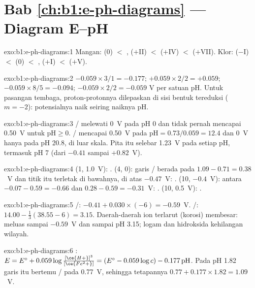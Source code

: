 \section*{Bab \ref{ch:b1:e-ph-diagrams} --- Diagram E--pH}

\begin{solution}{exo:b1:e-ph-diagrams:1}
Mangan:  (0) $<$ ,  ($+$II) $<$ 
($+$IV) $<$  ($+$VII). Klor:  ($-$I) $<$  (0)
$<$ ,  ($+$I) $<$  ($+$V).
\end{solution}

\begin{solution}{exo:b1:e-ph-diagrams:2}
$-0.059 \times 3/1 = -0.177$; $+0.059 \times 2/2 = +0.059$;
$-0.059 \times 8/5 = -0.094$; $-0.059 \times 2/2 = -0.059$ V per satuan
pH. Untuk pasangan tembaga, proton-protonnya dilepaskan di sisi bentuk
tereduksi ($m = -2$): potensialnya naik seiring naiknya pH.
\end{solution}

\begin{solution}{exo:b1:e-ph-diagrams:3}
/ melewati 0~V pada pH 0 dan tidak pernah mencapai 0.50~V
untuk $\mathrm{pH} \geqslant 0$. / mencapai 0.50~V pada
$\mathrm{pH} = 0.73/0.059 = 12.4$ dan 0~V hanya pada pH 20.8, di luar
skala. Pita itu selebar \qty{1.23}{V} pada setiap pH, termasuk pH 7
(dari $-0.41$ sampai $+0.82$~V).
\end{solution}

\begin{solution}{exo:b1:e-ph-diagrams:4}
(1, 1.0~V): . (4, 0): garis / berada pada
$1.09 - 0.71 = 0.38$~V dan titik itu terletak di bawahnya, di atas
$-0.47$~V: . (10, $-0.4$~V): antara $-0.07 - 0.59 = -0.66$ dan
$0.28 -
0.59 = -0.31$~V: . (10, 0.5~V): .
\end{solution}

\begin{solution}{exo:b1:e-ph-diagrams:5}
/: $-0.41 + 0.030 \times (-6) = -0.59$~V.
/: $14.00 - \frac13(38.55 - 6) = 3.15$. Daerah-daerah
ion terlarut (korosi) membesar:  meluas sampai $-0.59$~V dan
 sampai pH 3.15; logam dan hidroksida kehilangan wilayah.
\end{solution}

\begin{solution}{exo:b1:e-ph-diagrams:6}
: $E = E^\circ + 0.059\log\frac{[\ce{H+}]^3}{[\ce{Fe^2+}]}
= (E^\circ - 0.059\log c) - 0.177\,\mathrm{pH}$. Pada pH 1.82 garis itu
bertemu / pada 0.77~V, sehingga tetapannya
$0.77 + 0.177 \times 1.82
= 1.09$~V.
\end{solution}

